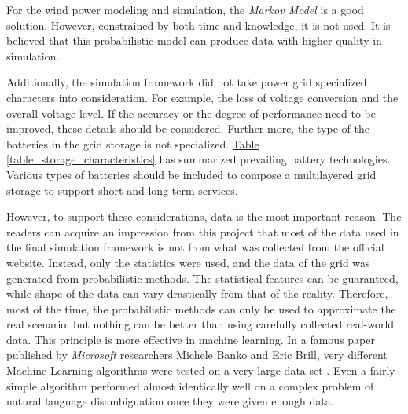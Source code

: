 \documentclass[12pt,a4paper]{report}
\begin{document}
        For the wind power modeling and simulation, the \emph{Markov Model} is a good solution. However, constrained by both time and knowledge, it is not used. It is believed that this probabilistic model can produce data with higher quality in simulation.

        Additionally, the simulation framework did not take power grid specialized characters into consideration. For example, the loss of voltage conversion and the overall voltage level. If the accuracy or the degree of performance need to be improved, these details should be considered. Further more, the type of the batteries in the grid storage is not specialized. \hyperref[table_storage_characteristics]{Table \ref*{table_storage_characteristics}} has summarized prevailing battery technologies. Various types of batteries should be included to compose a multilayered grid storage to support short and long term services.

        However, to support these considerations, data is the most important reason. The readers can acquire an impression from this project that most of the data used in the final simulation framework is not from what was collected from the official website. Instead, only the statistics were used, and the data of the grid was generated from probabilistic methods. The statistical features can be guaranteed, while shape of the data can vary drastically from that of the reality. Therefore, most of the time, the probabilistic methods can only be used to approximate the real scenario, but nothing can be better than using carefully collected real-world data. This principle is more effective in machine learning. In a famous paper published by \emph{Microsoft} researchers Michele Banko and Eric Brill, very different Machine Learning algorithms were tested on a very large data set \cite{paper:largedatasize}. Even a fairly simple algorithm performed almost identically well on a complex problem of natural language disambiguation once they were given enough data.
            
\end{document}

